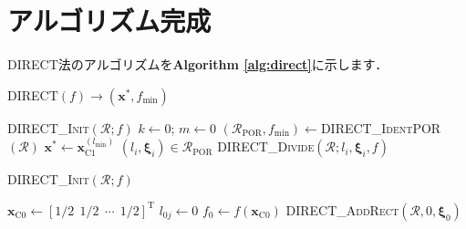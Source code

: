 ﻿\documentclass{jsarticle}
\begin{document}
\section{アルゴリズム完成}

DIRECT法のアルゴリズムを\textbf{Algorithm \ref{alg:direct}}に示します．

\begin{algorithm}[tbh]
\caption{\textsc{DIRECT}$(f)\rightarrow(\bm{x}^{*},f_{\mathrm{min}})$}
\label{alg:direct}
\begin{algorithmic}[1]
\State \textsc{DIRECT\_Init}$(\mathcal{R};f)$
\State $k\leftarrow 0$; $m\leftarrow 0$
  \State $(\mathcal{R}_{\mathrm{POR}},f_{\mathrm{min}})\leftarrow$\textsc{DIRECT\_IdentPOR}$(\mathcal{R})$
    \State $\bm{x}^{*}\leftarrow\bm{x}^{(l_{\mathrm{min}})}_{\mathrm{C}1}$
    \State {}
  \EndIf
    \State $(l_{i},\bm{\xi}_{i})\in\mathcal{R}_{\mathrm{POR}}$
    \State \textsc{DIRECT\_Divide}$(\mathcal{R};l_{i},\bm{\xi}_{i},f)$
  \EndWhile
\EndWhile
\end{algorithmic}
\end{algorithm}

\begin{algorithm}[tbh]
\caption{\textsc{DIRECT\_Init}$(\mathcal{R};f)$}
\label{alg:direct_init}
\begin{algorithmic}[1]
\State $\bm{x}_{\mathrm{C}0}\leftarrow[1/2~~1/2~~\cdots~~1/2]^{\mathrm{T}}$
  \State $l_{0j}\leftarrow 0$
\EndFor
\State $f_{0}\leftarrow f(\bm{x}_{\mathrm{C}0})$
\State \textsc{DIRECT\_AddRect}$(\mathcal{R},0,\bm{\xi}_{0})$
\end{algorithmic}
\end{algorithm}
\end{document}

